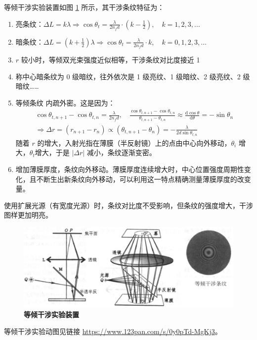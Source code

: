 \documentclass[UTF8]{report}
\theoremstyle{MyLineTheoremStyle} %
\theoremstyle{MyBlockTheoremStyle} %
\theoremstyle{MySubsubsectionStyle} %
\begin{document}
\noindent 等倾干涉实验装置如图 \ref{等倾干涉实验装置} 所示，其干涉条纹特征为：
\begin{enumerate}
\item 亮条纹：$\Delta L = k \lambda \Longrightarrow \cos \theta_t = \frac{\lambda}{2 n_f d} \cdot (k - \frac{1}{2}),\quad k = 1, 2, 3, ... $
\item 暗条纹：$\Delta L = (k + \frac{1}{2}) \lambda \Longrightarrow \cos \theta_t = \frac{\lambda}{2 n_f d} \cdot k,\quad k = 0, 1, 2, 3, ... $
\item $r$ 较小时，等倾双光束强度近似相等，干涉条纹对比度接近 1
\item 称中心暗条纹为 0 级暗纹，往外依次是 1 级亮纹、1 级暗纹、2 级亮纹、2 级暗纹…… 
\item 等倾条纹{\color{red} 内疏外密}。这是因为：
\begin{gather}
\cos \theta_{t, n + 1} - \cos \theta_{t, n} = \frac{\lambda}{2 n_f d},\quad \frac{\cos \theta_{t, n + 1} - \cos \theta_{t, n} }{\theta_{t, n + 1} - \theta_{t, n}}\approx \frac{\mathrm{d} \cos \theta }{\mathrm{d} \theta } = - \sin \theta_n \\ 
\Longrightarrow \Delta r = (r_{n +1} - r_n) \propto (\theta_{t, n+1} - \theta_n) = - \frac{\lambda}{2d \sin \theta_{t, n}}
\end{gather}
随着 $r$ 的增大，入射光指在薄膜（半反射镜）上的点由中心向外移动，$\theta_i$ 增大，$\theta_t$增大，于是 $| \Delta r |$ 减小，条纹逐渐变密。
\item 增加薄膜厚度，条纹向外移动。薄膜厚度连续增大时，中心位置强度周期性变化，且不断生出新条纹向外移动，可以利用这一特点精确测量薄膜厚度的改变量。
\end{enumerate}

使用扩展光源（有宽度光源）时，条纹对比度不受影响，但条纹的强度增大，干涉图样更加明亮。

\begin{figure}[H]\centering
\includegraphics[width=0.7\columnwidth]{assets/3/等倾干涉.jpg}
\caption{\bfseries 等倾干涉实验装置}\label{等倾干涉实验装置}
\end{figure}

等倾干涉实验动图见链接 \href{https://www.123pan.com/s/0y0pTd-MgKj3}{https://www.123pan.com/s/0y0pTd-MgKj3}。
\end{document}
